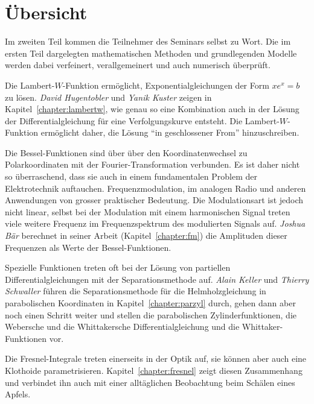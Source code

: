 %
%
%
\chapter*{Übersicht}
\rhead{}
\label{buch:uebersicht}
Im zweiten Teil kommen die Teilnehmer des Seminars selbst zu Wort.
Die im ersten Teil dargelegten mathematischen Methoden und
grundlegenden Modelle werden dabei verfeinert, verallgemeinert
und auch numerisch überprüft.

Die Lambert-$W$-Funktion ermöglicht, Exponentialgleichungen der
Form $xe^x=b$ zu lösen.
{\em David Hugentobler}
%
%
und
{\em Yanik Kuster}
%
%
zeigen in Kapitel~\ref{chapter:lambertw}, wie genau so eine Kombination
auch in der Lösung der Differentialgleichung für eine Verfolgungskurve
entsteht.
Die Lambert-$W$-Funktion ermöglicht daher, die Lösung ``in geschlossener
From'' hinzuschreiben.

Die Bessel-Funktionen sind über über den Koordinatenwechsel zu
Polarkoordinaten mit der Fourier-Transformation verbunden.
Es ist daher nicht so überraschend, dass sie auch in einem 
fundamentalen Problem der Elektrotechnik auftauchen.
Frequenzmodulation, im analogen Radio und anderen Anwendungen
von grosser praktischer Bedeutung.
Die Modulationsart ist jedoch nicht linear, selbst bei der Modulation
mit einem harmonischen Signal treten viele weitere Frequenz im 
Frequenzspektrum des modulierten Signals auf.
{\em Joshua Bär}
%
%
berechnet in seiner Arbeit (Kapitel~\ref{chapter:fm}) die Amplituden
dieser Frequenzen als Werte der Bessel-Funktionen.

Spezielle Funktionen treten oft bei der Lösung von
partiellen Differentialgleichungen mit der Separationsmethode auf.
{\em Alain Keller} 
%
%
und
{\em Thierry Schwaller}
%
%
führen die Separationsmethode für die Helmholzgleichung in parabolischen
Koordinaten in Kapitel~\ref{chapter:parzyl}
durch, gehen dann aber noch einen Schritt weiter und 
stellen die parabolischen Zylinderfunktionen,
die Webersche und die Whittakersche Differentialgleichung und die
Whittaker-Funktionen vor.

Die Fresnel-Integrale treten einerseits in der Optik auf, sie können aber
auch eine Klothoide parametrisieren.
Kapitel~\ref{chapter:fresnel} zeigt diesen Zusammenhang und verbindet
ihn auch mit einer alltäglichen Beobachtung beim Schälen eines Apfels.

